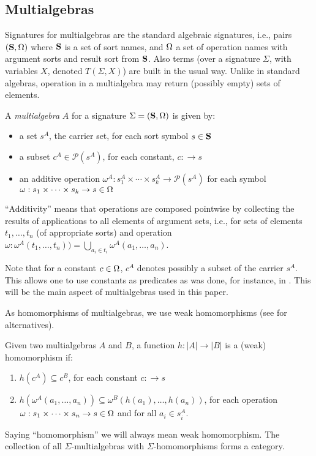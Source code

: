 \subsection{Multialgebras}\label{sub:ma}
Signatures for multialgebras are the standard algebraic signatures, i.e.,
pairs $({\bf S},\Omega)$ where ${\bf S}$ is a set of sort names, and $\Omega$ a
set of operation names with argument sorts and result sort from
${\bf S}$. Also terms (over a signature $\Sigma$, with variables $X$, denoted
$T(\Sigma,X)$) are built in the usual way. 
Unlike in standard algebras, operation in a multialgebra may return
(possibly empty) sets of elements.
%
\begin{definition}\label{def:ma}
A {\em multialgebra} $A$ for a signature $\Sigma=({\bf S},\Omega)$ is given by:
\begin{itemize}\MyLPar
\item  a set $s^A$, the carrier set, for each sort symbol $s\in{\bf S}$
\item  a subset $ c^A \in {\mathcal{P}}(s^A)$, for each constant, $c:\to s$
\item an additive operation $\omega^A : s_1^A \times \cdots \times s_k^A \to {\mathcal{P}}(s^A)$
	for each symbol $\omega : s_1\times\cdots\times s_k \to s \in \Omega$
\end{itemize}
\end{definition}
``Additivity'' means that operations are composed pointwise by collecting the
results of applications to all elements of argument sets, i.e., for sets of elements
$t_1,\ldots,t_n$ (of appropriate sorts) and operation $\omega:
\omega^A(t_1 , \ldots ,t_n)) = \bigcup_{a_{i}\in t_{i}}\omega^A(a_1 , \ldots
,a_n)$. 

Note that for a constant $c \in \Omega$, $c^A$ denotes possibly a subset of the
carrier $s^A$. This allows one to use constants as predicates as was done,
for instance, in \cite{partial}. This will be the main aspect of
multialgebras used in this paper.

As homomorphisms of multialgebras, we use weak homomorphisms (see
\cite{catrel} for alternatives).
\begin{definition}Given two multialgebras $A$ and $B$, 
a function $h: |A| \to |B|$ is a (weak) homomorphism if:
\begin{enumerate}\MyLPar
\item $h(c^A) \subseteq c^B$, for each constant $c: \to s$ 
\item $h(\omega^A(a_1 , \ldots , a_n)) \subseteq\omega^B(h(a_1), \ldots ,h(a_n))$,
for each operation  $\omega:s_1\times\cdots\times s_n\to s\in\Omega$ and for all $a_i \in s_{i}^A$.
\end{enumerate}
\end{definition}
Saying ``homomorphism'' we will always mean weak homomorphism.
The collection of all $\Sigma$-multialgebras with $\Sigma$-homomorphisms
forms a category. 

